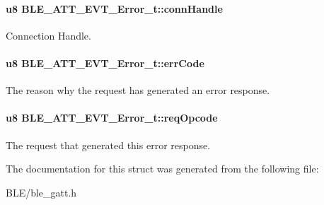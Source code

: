 \paragraph[{\texorpdfstring{conn\+Handle}{connHandle}}]{\setlength{\rightskip}{0pt plus 5cm}u8 B\+L\+E\+\_\+\+A\+T\+T\+\_\+\+E\+V\+T\+\_\+\+Error\+\_\+t\+::conn\+Handle}\hypertarget{struct_b_l_e___a_t_t___e_v_t___error__t_a831c30fbcd86b298ea4c0cc4225558a7}{}\label{struct_b_l_e___a_t_t___e_v_t___error__t_a831c30fbcd86b298ea4c0cc4225558a7}
Connection Handle. 
\paragraph[{\texorpdfstring{err\+Code}{errCode}}]{\setlength{\rightskip}{0pt plus 5cm}u8 B\+L\+E\+\_\+\+A\+T\+T\+\_\+\+E\+V\+T\+\_\+\+Error\+\_\+t\+::err\+Code}\hypertarget{struct_b_l_e___a_t_t___e_v_t___error__t_a0da6b9b9363d925bc8b703c9fdd1cdfe}{}\label{struct_b_l_e___a_t_t___e_v_t___error__t_a0da6b9b9363d925bc8b703c9fdd1cdfe}
The reason why the request has generated an error response. 
\paragraph[{\texorpdfstring{req\+Opcode}{reqOpcode}}]{\setlength{\rightskip}{0pt plus 5cm}u8 B\+L\+E\+\_\+\+A\+T\+T\+\_\+\+E\+V\+T\+\_\+\+Error\+\_\+t\+::req\+Opcode}\hypertarget{struct_b_l_e___a_t_t___e_v_t___error__t_adb4538600002ad67fedf1dd814783866}{}\label{struct_b_l_e___a_t_t___e_v_t___error__t_adb4538600002ad67fedf1dd814783866}
The request that generated this error response. 

The documentation for this struct was generated from the following file\+:\begin{DoxyCompactItemize}
\item 
B\+L\+E/ble\+\_\+gatt.\+h\end{DoxyCompactItemize}
